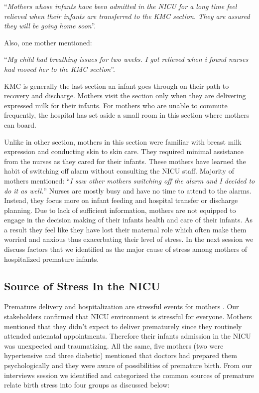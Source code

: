 \enquote{\itshape Mothers whose infants have been admitted in the NICU for a long time feel relieved when their infants are transferred to the KMC section. They are assured they will be going home soon}. 

Also, one mother mentioned:

\enquote{\itshape My child had breathing issues for two weeks. I got relieved when i found nurses had moved her to the KMC section}.\bigbreak

KMC is generally the last section an infant goes through on their path to recovery and discharge. Mothers visit the section only when they are delivering expressed milk for their infants. For mothers who are unable to commute frequently, the hospital has set aside a small room in this section where mothers can board.

Unlike in other section, mothers in this section were familiar with breast milk expression and conducting skin to skin care. They required minimal assistance from the nurses as they cared for their infants. These mothers have learned the habit of switching off alarm without consulting the NICU staff. Majority of mothers mentioned: \enquote{\itshape I saw other mothers switching off the alarm and I decided to do it as well.} Nurses are mostly busy and have no time to attend to the alarms. Instead, they focus more on infant feeding and hospital transfer or discharge planning. Due to lack of sufficient information, mothers are not equipped to engage in the decision making of their infants health and care of their infants. As a result they feel like they have lost their maternal role which often make them worried and anxious thus exacerbating their level of stress. In the next session we discuss factors that we identified as the major cause of stress among mothers of hospitalized premature infants.

\subsection{Source of Stress In the NICU}
Premature delivery and hospitalization are stressful events for mothers \citep{Wigert2012, Heidari2017}. Our stakeholders confirmed that NICU environment is stressful for everyone. Mothers mentioned that they didn't expect to deliver prematurely since they routinely attended antenatal appointments. Therefore their infants admission in the NICU was unexpected and traumatizing. All the same, five mothers (two were hypertensive and three diabetic) mentioned that doctors had prepared them psychologically and they were aware of possibilities of premature birth. From our interviews session we identified and categorized the common sources of premature relate birth stress into four groups as discussed below:

